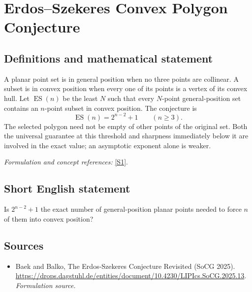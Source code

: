 \documentclass[11pt]{article}
\begin{document}
\section*{\texorpdfstring{Erdos--Szekeres Convex Polygon Conjecture}{Erdos--Szekeres Convex Polygon Conjecture}}\label{290}
\subsection{Definitions and mathematical statement}
A planar point set is in general position when no three points are collinear. A subset is in convex position when every one of its points is a vertex of its convex hull. Let $\operatorname{ES}(n)$ be the least $N$ such that every $N$-point general-position set contains an $n$-point subset in convex position. The conjecture is
\[
 \operatorname{ES}(n)=2^{n-2}+1\qquad(n\ge3).
\]
The selected polygon need not be empty of other points of the original set. Both the universal guarantee at this threshold and sharpness immediately below it are involved in the exact value; an asymptotic exponent alone is weaker.
\par\smallskip\textit{Formulation and concept references:} \href{https://drops.dagstuhl.de/entities/document/10.4230/LIPIcs.SoCG.2025.13}{[S1]}.

\subsection{Short English statement}
Is $2^{n-2}+1$ the exact number of general-position planar points needed to force $n$ of them into convex position?
\subsection{Sources}
\begin{itemize}
\item[S1]Baek and Balko, The Erdos-Szekeres Conjecture Revisited (SoCG 2025).
\url{https://drops.dagstuhl.de/entities/document/10.4230/LIPIcs.SoCG.2025.13}.
\textit{Formulation source.}
\end{itemize}
\end{document}
